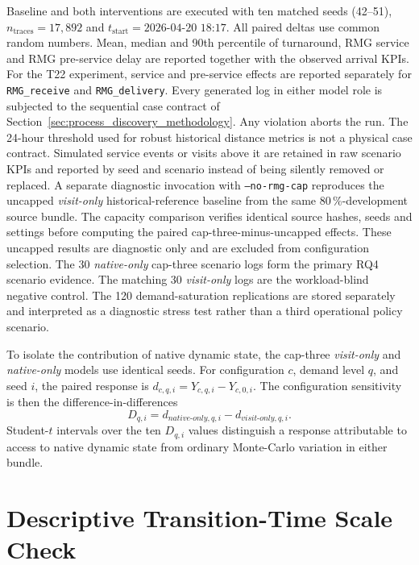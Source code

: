 Baseline and both interventions are executed with ten matched seeds
(42--51), $n_{\text{traces}}=17{,}892$ and
$t_{\text{start}}=\text{2026-04-20 18:17}$. All paired deltas use
common random numbers. Mean, median and 90th percentile of turnaround,
RMG service and RMG pre-service delay are reported together with the
observed arrival KPIs. For the T22 experiment, service and pre-service
effects are reported separately for
\texttt{RMG\_receive} and \texttt{RMG\_delivery}. Every generated log in
either model role is subjected
to the sequential case contract of
Section~\ref{sec:process_discovery_methodology}. Any violation aborts
the run. The 24-hour threshold used for robust historical distance metrics is
not a physical case contract. Simulated service events or visits above it are
retained in raw scenario KPIs and reported by seed and scenario instead of
being silently removed or replaced. A separate diagnostic invocation with
\texttt{--no-rmg-cap} reproduces the uncapped \textit{visit-only}
historical-reference baseline from the same
80\,\%-development source bundle. The capacity comparison verifies identical
source hashes, seeds and settings before computing the paired
cap-three-minus-uncapped effects. These uncapped results are diagnostic only
and are excluded from configuration selection. The 30 \textit{native-only}
cap-three scenario logs form the primary RQ4 scenario evidence. The matching
30 \textit{visit-only} logs are the workload-blind negative control. The 120
demand-saturation replications are stored separately and interpreted as a
diagnostic stress test rather than a third operational policy scenario.

To isolate the contribution of native dynamic state, the cap-three
\textit{visit-only} and \textit{native-only} models use identical seeds. For
configuration $c$, demand level $q$, and seed $i$, the paired response is
$d_{c,q,i}=Y_{c,q,i}-Y_{c,0,i}$. The configuration sensitivity is then the
difference-in-differences
\begin{equation}
    D_{q,i}=d_{\textit{native-only},q,i}
             -d_{\textit{visit-only},q,i}.
\end{equation}
Student-$t$ intervals over the ten $D_{q,i}$ values distinguish a response
attributable to access to native dynamic state from ordinary Monte-Carlo
variation in either bundle.

\section{Descriptive Transition-Time Scale Check}
\label{sec:results_percentile_sens_design}

